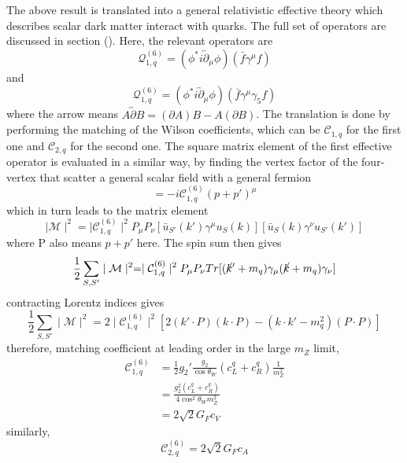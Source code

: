 \documentclass[12pt]{article}
\begin{document}
The above result is translated into a general relativistic effective theory which describes scalar dark matter interact with quarks. The full set of operators are discussed in section (). Here, the relevant operators are
$$
\mathcal Q_{1,q}^{(6)} = (\phi^* i \overleftrightarrow\partial_\mu \phi ) ( \bar f \gamma^\mu f ) 
$$
and 
$$
\mathcal Q_{1,q}^{(6)} = (\phi^* i \overleftrightarrow\partial_\mu \phi ) ( \bar f \gamma^\mu\gamma_5 f ) 
$$
where the arrow means $A \overleftrightarrow\partial B= (\partial A)B-A(\partial B)$. The translation is done by performing the matching of the Wilson coefficients, which can be $ \mathcal  C_{1,q}$ for the first one and $\mathcal  C_{2,q}$  for the second one. 
The square matrix element of the first effective operator is evaluated in a similar way, by finding the vertex factor of the four-vertex that scatter a general scalar field with a general fermion
$$
= -i  \mathcal C^{(6)}_{1,q} (p+p')^\mu
$$
which in turn leads to the matrix element
 $$
\mid \mathcal  M \mid^2 = \mid \mathcal  C_{1,q}^{(6)}  \mid^2 P_\mu P_\nu  [\bar u_{S'}(k')   \gamma^\mu  u_S(k)] [\bar u_{S}(k)   \gamma^\nu   u_{S'}(k')]
$$
where P also means $p+p'$ here. The spin sum then gives
$$
\frac{1}{2}\sum_{S,S'} \mid \mathcal M \mid ^2 = 
 \mid \mathcal  C_{1,q}^{(6)}  \mid^2 P_\mu P_\nu Tr[(\cancel k'+m_q)  \gamma_\mu (\cancel k+m_q) \gamma_\nu]
$$
contracting Lorentz indices gives
$$
\frac{1}{2}\sum_{S,S'} \mid \mathcal M \mid ^2 =
2 \mid \mathcal  C_{1,q}^{(6)}  \mid^2 [ 2(k' \cdot P)(k \cdot P)-( k \cdot k' - m_q^2)(P \cdot P )]
$$
therefore, matching coefficient at leading order in the large $m_Z$ limit, 
\begin{equation}
\begin{aligned}
   \mathcal  C_{1,q}^{(6)} 
 &
=   \frac{1}{2} g_2' \frac{g_2}{\cos \theta_W}( c_L^{q}+c_R^{q}) \frac{1}{m_Z^2}\\
& = \frac{g_2^2 ( c_L^{q}+c_R^{q}) }{4\cos^2\theta_Wm_Z^2}\\
&= 2\sqrt 2 G_F c_V
 \end{aligned}
 \end{equation}
 similarly, 
 $$
 \mathcal  C_{2,q}^{(6)}  = 2\sqrt 2 G_F c_A
$$
\end{document}
